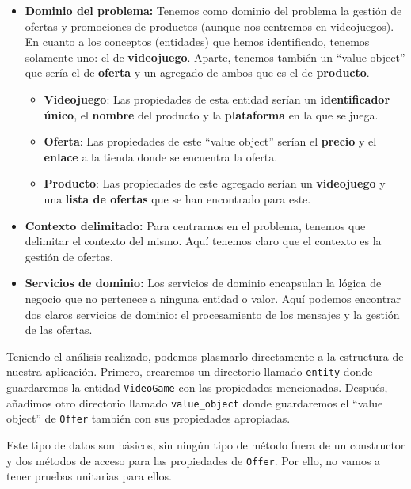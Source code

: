\begin{itemize}
    \item \textbf{Dominio del problema:} Tenemos como dominio del problema la 
    gestión de ofertas y promociones de productos (aunque nos centremos en 
    videojuegos). En cuanto a los conceptos (entidades) que hemos identificado, 
    tenemos solamente uno: el de \textbf{videojuego}. Aparte, tenemos también un 
    ``value object'' que sería el de \textbf{oferta} y un agregado de ambos que es 
    el de \textbf{producto}.
    \begin{itemize}
        \item \textbf{Videojuego}: Las propiedades de esta entidad serían un 
        \textbf{identificador único}, el \textbf{nombre} del producto y la 
        \textbf{plataforma} en la que se juega.
        \item \textbf{Oferta}: Las propiedades de este ``value object'' serían el 
        \textbf{precio} y el \textbf{enlace} a la tienda donde se encuentra la 
        oferta.
        \item \textbf{Producto}: Las propiedades de este agregado serían un 
        \textbf{videojuego} y una \textbf{lista de ofertas} que se han encontrado 
        para este.
    \end{itemize}
    \item \textbf{Contexto delimitado:} Para centrarnos en el problema, tenemos que 
    delimitar el contexto del mismo. Aquí tenemos claro que el contexto es la 
    gestión de ofertas.
    \item \textbf{Servicios de dominio:} Los servicios de dominio encapsulan la 
    lógica de negocio que no pertenece a ninguna entidad o valor. Aquí podemos 
    encontrar dos claros servicios de dominio: el procesamiento de los mensajes y 
    la gestión de las ofertas.
\end{itemize}

Teniendo el análisis realizado, podemos plasmarlo directamente a la estructura de 
nuestra aplicación. Primero, crearemos un directorio llamado \verb|entity| donde 
guardaremos la entidad \verb|VideoGame| con las propiedades mencionadas. Después, 
añadimos otro directorio llamado \verb|value_object| donde guardaremos el ``value 
object'' de \verb|Offer| también con sus propiedades apropiadas.

Este tipo de datos son básicos, sin ningún tipo de método fuera de un constructor y 
dos métodos de acceso para las propiedades de \verb|Offer|. Por ello, no vamos a 
tener pruebas unitarias para ellos.

